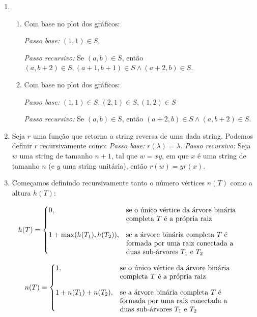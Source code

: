 \documentclass{article}
\begin{document}
\begin{enumerate}
\begin{enumerate}
	      \end{enumerate}

	\item

	      \begin{enumerate}

		      \item Com base no plot dos gráficos:

		            \textit{Passo base:} \( (1,1) \in S,\)

		            \textit{Passo recursivo:} Se \( (a,b) \in S \), então \(
		            (a,b + 2) \in S, (a+1,b+1) \in S \land (a+2,b) \in S\).

		      \item Com base no plot dos gráficos:

		            \textit{Passo base:} \( (1,1) \in S, (2,1) \in S, (1,2) \in
		            S\)

		            \textit{Passo recursivo:} Se \( (a,b) \in S \), então \(
		            (a+2,b) \in S \land (a,b+2) \in S \).

	      \end{enumerate}

	\item Seja \( r \) uma função que retorna a string reversa de uma dada
	      string. Podemos definir \( r \) recursivamente como: \textit{Passo
		      base:} \( r(\lambda) = \lambda \). \textit{Passo recursivo:} Seja \( w
	      \) uma string de tamanho \( n+1 \), tal que \( w = xy \), em que \( x \)
	      é uma string de tamanho \( n \) (e \( y \) uma string unitária), então
	      \( r(w) = yr(x) \).

	\item Começamos definindo recursivamente tanto o número vértices \( n(T) \)
	      como a altura \( h(T) \):

	      \[ h(T) = \begin{cases} 0,                       &
              \parbox[t]{.5\textwidth}{\raggedright se o único vértice da árvore
              binária completa \(T\) é a própria raiz} \\[2em]

              1 + \max(h(T_1),h(T_2)), &
              \parbox[t]{.5\textwidth}{\raggedright se a árvore binária completa
	              \( T \) é formada por uma raiz conectada a duas sub-árvores \( T_1 \)
	              e \( T_2 \)}\end{cases} \]

	      \[ n(T) = \begin{cases} 1, &
              \parbox[t]{.5\textwidth}{\raggedright se o único vértice da árvore
	              binária completa \( T \) é a própria raiz}
              \\[2em] 1 + n(T_1) + n(T_2), &
              \parbox[t]{.5\textwidth}{\raggedright se a árvore binária completa
	              \( T \) é formada por uma raiz conectada a duas sub-árvores \( T_1
	              \) e \( T_2 \)}\end{cases}\]


\end{enumerate}
\end{document}
